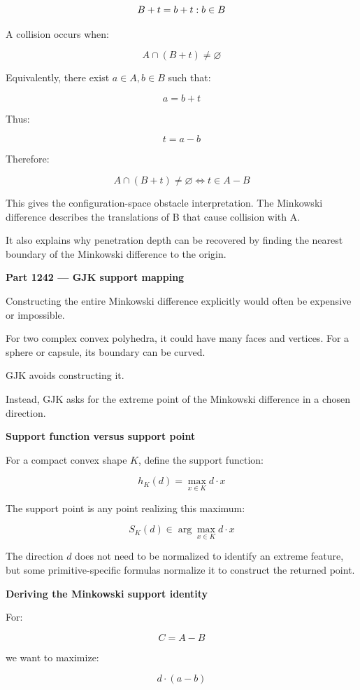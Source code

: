 \[
B+t=\\{b+t:b\in B\\}
\]

A collision occurs when:

\[
A\cap(B+t)\ne\varnothing
\]

Equivalently, there exist \(a\in A,b\in B\) such that:

\[
a=b+t
\]

Thus:

\[
t=a-b
\]

Therefore:

\[
\boxed{ A\cap(B+t)\ne\varnothing \iff t\in A-B }
\]

This gives the configuration-space obstacle interpretation. The Minkowski difference describes the translations of B that cause collision with A.

It also explains why penetration depth can be recovered by finding the nearest boundary of the Minkowski difference to the origin.

\textbf{Part 1242 --- GJK support mapping}

Constructing the entire Minkowski difference explicitly would often be expensive or impossible.

For two complex convex polyhedra, it could have many faces and vertices. For a sphere or capsule, its boundary can be curved.

GJK avoids constructing it.

Instead, GJK asks for the extreme point of the Minkowski difference in a chosen direction.

\textbf{Support function versus support point}

For a compact convex shape \(K\), define the support function:

\[
\boxed{ h_K(d)=\max_{x\in K}d\cdot x }
\]

The support point is any point realizing this maximum:

\[
\boxed{ S_K(d)\in\arg\max_{x\in K}d\cdot x }
\]

The direction \(d\) does not need to be normalized to identify an extreme feature, but some primitive-specific formulas normalize it to construct the returned point.

\textbf{Deriving the Minkowski support identity}

For:

\[
C=A-B
\]

we want to maximize:

\[
d\cdot(a-b)
\]


